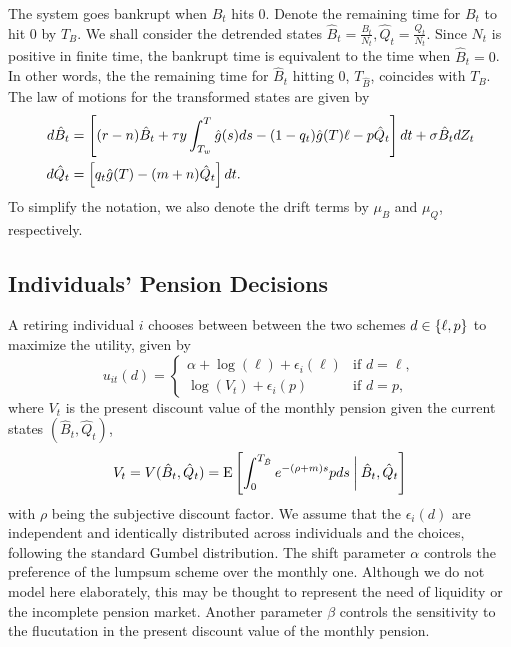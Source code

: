 \documentclass[a4paper, 12pt]{article}
\begin{document}
The system goes bankrupt when $B_t$ hits $0$. Denote the remaining 
time for $B_t$ to hit $0$ by $T_B$. We shall consider the detrended states 
$\hat{B}_t = \frac{B_t}{N_t}, \hat{Q}_t = \frac{Q_t}{N_t}$. 
Since $N_t$ is positive in finite time, the bankrupt time 
is equivalent to the time when $\hat{B}_t = 0$. In other words, 
the the remaining time for $\hat{B}_t$ hitting $0$, $T_{\hat{B}}$, coincides 
with $T_{B}$. The law of motions for the transformed states are given by 
\begin{align}\label{eq:state_dynamic}
    d\hat{B}_t &= \left[ {(r-n)\hat{B}_t + \tau y\int_{T_w}^T\hat{g}(s)ds - (1-q_t)\hat{g}(T)\ell - p\hat{Q}_t} \right]dt + \sigma\hat{B}_tdZ_t \\
    d\hat{Q}_t &= \left[ {q_t\hat{g}(T)-(m+n)\hat{Q}_t} \right]dt. 
\end{align}
To simplify the notation, we also denote the drift terms 
by $\mu_B$ and $\mu_Q$, respectively.

\subsection{Individuals' Pension Decisions}
A retiring individual $i$ chooses between between the two 
schemes $d\in\left\{ {\ell, p} \right\}$ to maximize the utility, given by  
\begin{equation}
    u_{it}(d) = \begin{cases}
        \alpha + \log(\ell) + \epsilon_i(\ell) &\text{if } d = \ell, \\
        \log(V_t) + \epsilon_i(p) &\text{if } d = p,
    \end{cases}
\end{equation}
where $V_t$ is the present discount value of the monthly pension 
given the current states $(\hat{B}_t, \hat{Q}_t)$, 
\begin{equation}\label{eq:value}
    V_t = V(\hat{B}_t, \hat{Q}_t) = \operatorname{E}\left[ {\int_0^{T_{\hat{B}}} e^{-(\rho+m)s}pds\:\bigg|\: \hat{B}_t, \hat{Q}_t} \right]
\end{equation}
with $\rho$ being the subjective discount factor. We assume that 
the $\epsilon_i(d)$ are independent and identically 
distributed across individuals and the choices, following the 
standard Gumbel distribution. The shift parameter $\alpha$ controls 
the preference of the lumpsum scheme over the monthly one. Although 
we do not model here elaborately, this may be thought to represent 
the need of liquidity or the incomplete pension market. Another 
parameter $\beta$ controls the sensitivity to the flucutation in 
the present discount value of the monthly pension.  
\end{document}
